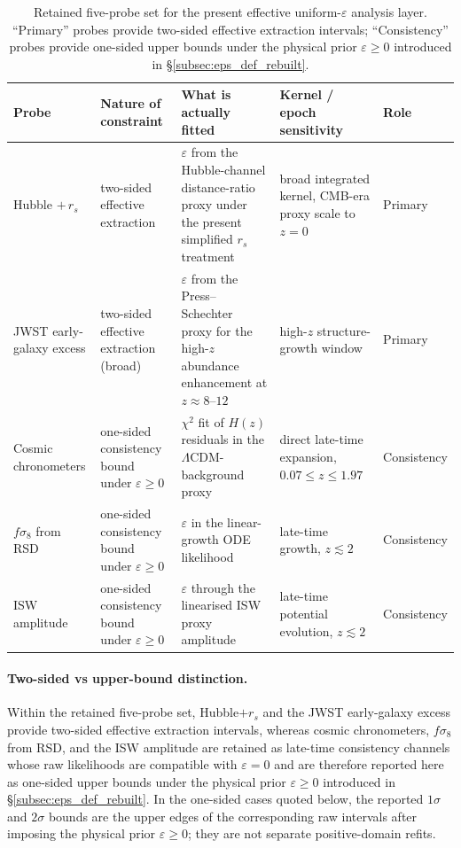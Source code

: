 \begin{table}[htbp]
\centering
\renewcommand{\arraystretch}{1.25}
\small
\begin{tabular}{@{}p{2.6cm}p{3.1cm}p{3.4cm}p{3.0cm}p{1.6cm}@{}}
\toprule
\textbf{Probe} & \textbf{Nature of constraint} & \textbf{What is actually fitted} & \textbf{Kernel / epoch sensitivity} & \textbf{Role} \\
\midrule
Hubble $+\,r_s$ &
two-sided effective extraction &
$\varepsilon$ from the Hubble-channel distance-ratio proxy under the present simplified $r_s$ treatment &
broad integrated kernel, CMB-era proxy scale to $z=0$ &
Primary \\
\addlinespace
JWST early-galaxy excess &
two-sided effective extraction (broad) &
$\varepsilon$ from the Press--Schechter proxy for the high-$z$ abundance enhancement at $z\approx 8$--$12$ &
high-$z$ structure-growth window &
Primary \\
\addlinespace
Cosmic chronometers &
one-sided consistency bound under $\varepsilon\geq 0$ &
$\chi^2$ fit of $H(z)$ residuals in the $\Lambda$CDM-background proxy &
direct late-time expansion, $0.07\leq z\leq 1.97$ &
Consistency \\
\addlinespace
$f\sigma_8$ from RSD &
one-sided consistency bound under $\varepsilon\geq 0$ &
$\varepsilon$ in the linear-growth ODE likelihood &
late-time growth, $z\lesssim 2$ &
Consistency \\
\addlinespace
ISW amplitude &
one-sided consistency bound under $\varepsilon\geq 0$ &
$\varepsilon$ through the linearised ISW proxy amplitude &
late-time potential evolution, $z\lesssim 2$ &
Consistency \\
\bottomrule
\end{tabular}
\caption{Retained five-probe set for the present effective
uniform-$\varepsilon$ analysis layer. ``Primary'' probes provide two-sided
effective extraction intervals; ``Consistency'' probes provide
one-sided upper bounds under the physical prior
$\varepsilon\geq 0$ introduced in \S\ref{subsec:eps_def_rebuilt}.}
\label{tab:eps_retained_probes_rebuilt}
\end{table}

\paragraph{Two-sided vs upper-bound distinction.}
Within the retained five-probe set, Hubble$+r_s$ and the JWST
early-galaxy excess provide two-sided effective extraction intervals,
whereas cosmic chronometers, $f\sigma_8$ from RSD, and the ISW
amplitude are retained as late-time consistency channels whose raw
likelihoods are compatible with $\varepsilon = 0$ and are therefore
reported here as one-sided upper bounds under the physical prior
$\varepsilon\geq 0$ introduced in \S\ref{subsec:eps_def_rebuilt}.
In the one-sided cases quoted below, the reported $1\sigma$ and
$2\sigma$ bounds are the upper edges of the corresponding raw
intervals after imposing the physical prior $\varepsilon \geq 0$;
they are not separate positive-domain refits.

